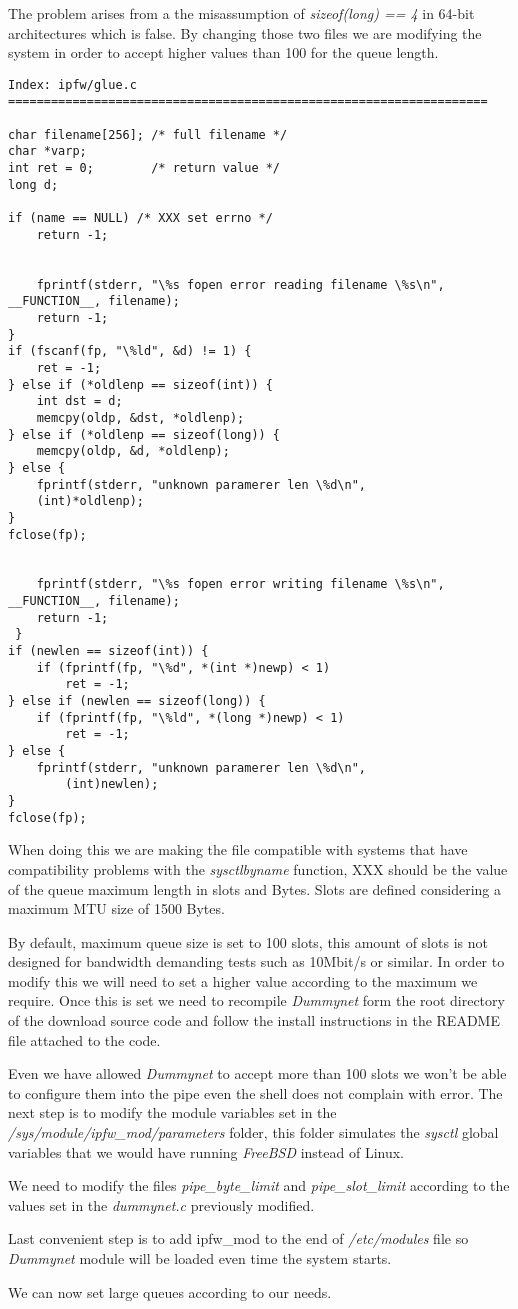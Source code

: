 The problem arises from a the misassumption of {\it sizeof(long) == 4} in 64-bit architectures which is false. By changing those two files we are modifying the system in order to accept higher values than 100 for the queue length.

\lstset{language=C}
\begin{lstlisting}
Index: ipfw/glue.c
===================================================================

char filename[256];	/* full filename */
char *varp;
int ret = 0;		/* return value */
long d;
 
if (name == NULL) /* XXX set errno */
	return -1;


	fprintf(stderr, "\%s fopen error reading filename \%s\n", __FUNCTION__, filename);
	return -1;
}
if (fscanf(fp, "\%ld", &d) != 1) {
	ret = -1;
} else if (*oldlenp == sizeof(int)) {
	int dst = d;
	memcpy(oldp, &dst, *oldlenp);
} else if (*oldlenp == sizeof(long)) {
	memcpy(oldp, &d, *oldlenp);
} else {
	fprintf(stderr, "unknown paramerer len \%d\n",
	(int)*oldlenp);
}
fclose(fp);


	fprintf(stderr, "\%s fopen error writing filename \%s\n", __FUNCTION__, filename);
 	return -1;
 }
if (newlen == sizeof(int)) {
	if (fprintf(fp, "\%d", *(int *)newp) < 1)
		ret = -1;
} else if (newlen == sizeof(long)) {
	if (fprintf(fp, "\%ld", *(long *)newp) < 1)
		ret = -1;
} else {
	fprintf(stderr, "unknown paramerer len \%d\n",
		(int)newlen);
}
fclose(fp);

\end{lstlisting}

When doing this we are making the file compatible with systems that have compatibility problems with the {\it sysctlbyname} function, XXX should be the value of the queue maximum length in slots and Bytes. Slots are defined considering a maximum MTU size of 1500 Bytes.

By default, maximum queue size is set to 100 slots, this amount of slots is not designed for bandwidth demanding tests such as 10Mbit/s or similar. In order to modify this we will need to set a higher value according to the maximum we require. Once this is set we need to recompile {\it Dummynet} form the root directory of the download source code and follow the install instructions in the README file attached to the code.

Even we have allowed {\it Dummynet} to accept more than 100 slots we won't be able to configure them into the pipe even the shell does not complain with error. The next step is to modify the module variables set in the {\it /sys/module/ipfw\_mod/parameters} folder, this folder simulates the {\it sysctl} global variables that we would have running {\it FreeBSD} instead of Linux. 

We need to modify the files {\it pipe\_byte\_limit} and {\it pipe\_slot\_limit} according to the values set in the {\it dummynet.c} previously modified.

Last convenient step is to add ipfw\_mod to the end of {\it /etc/modules} file so {\it Dummynet} module will be loaded even time the system starts. 

We can now set large queues according to our needs.